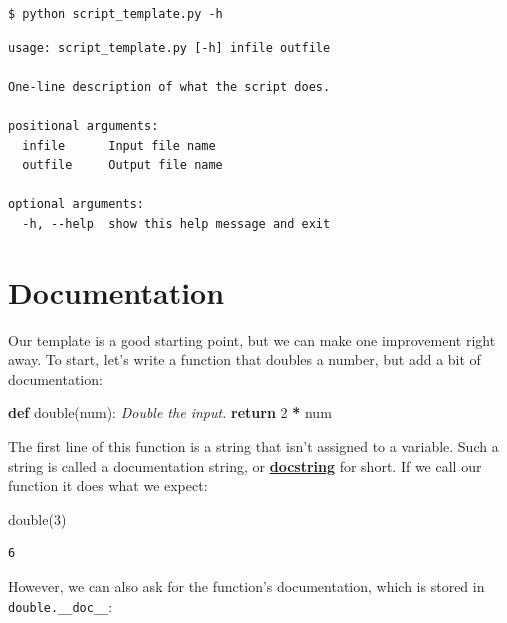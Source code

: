 \documentclass[
]{krantz}
\makeatletter
\newenvironment{Shaded}{\begin{snugshade}}{\end{snugshade}}
\newcommand{\CommentTok}[1]{\textcolor[rgb]{0.56,0.35,0.01}{\textit{#1}}}
\newcommand{\ControlFlowTok}[1]{\textcolor[rgb]{0.13,0.29,0.53}{\textbf{#1}}}
\newcommand{\DecValTok}[1]{\textcolor[rgb]{0.00,0.00,0.81}{#1}}
\newcommand{\KeywordTok}[1]{\textcolor[rgb]{0.13,0.29,0.53}{\textbf{#1}}}
\newcommand{\NormalTok}[1]{#1}
\newcommand{\OperatorTok}[1]{\textcolor[rgb]{0.81,0.36,0.00}{\textbf{#1}}}
\newenvironment{kframe}{%
\medskip{}
\setlength{\fboxsep}{.8em}
 \def\at@end@of@kframe{}%
 \ifinner\ifhmode%
  \def\at@end@of@kframe{\end{minipage}}%
  \begin{minipage}{\columnwidth}%
 \fi\fi%
 \def\FrameCommand##1{\hskip\@totalleftmargin \hskip-\fboxsep
 \colorbox{shadecolor}{##1}\hskip-\fboxsep
     \hskip-\linewidth \hskip-\@totalleftmargin \hskip\columnwidth}%
 \MakeFramed {\advance\hsize-\width
   \@totalleftmargin\z@ \linewidth\hsize
   \@setminipage}}%
 {\par\unskip\endMakeFramed%
 \at@end@of@kframe}
\renewenvironment{Shaded}{\begin{kframe}}{\end{kframe}}
\newcommand{\gref}[2]{\hyperlink{#2}{\textbf{#1}}}
\makeatother
\begin{document}
\begin{verbatim}
$ python script_template.py -h
\end{verbatim}

\begin{verbatim}
usage: script_template.py [-h] infile outfile

One-line description of what the script does.

positional arguments:
  infile      Input file name
  outfile     Output file name

optional arguments:
  -h, --help  show this help message and exit
\end{verbatim}

\hypertarget{scripting-docstrings}{%
\section{Documentation}\label{scripting-docstrings}}

Our template is a good starting point,
but we can make one improvement right away.
To start,
let's write a function that doubles a number,
but add a bit of documentation:

\begin{Shaded}
\begin{Highlighting}[]
\KeywordTok{def}\NormalTok{ double(num):}
    \CommentTok{\textquotesingle{}Double the input.\textquotesingle{}}
    \ControlFlowTok{return} \DecValTok{2} \OperatorTok{*}\NormalTok{ num}
\end{Highlighting}
\end{Shaded}

The first line of this function is a string
that isn't assigned to a variable.
Such a string is called a documentation string,
or \gref{docstring}{docstring} for short.
If we call our function it does what we expect:

\begin{Shaded}
\begin{Highlighting}[]
\NormalTok{double(}\DecValTok{3}\NormalTok{)}
\end{Highlighting}
\end{Shaded}

\begin{verbatim}
6
\end{verbatim}

However,
we can also ask for the function's documentation,
which is stored in \texttt{double.\_\_doc\_\_}:
\end{document}
